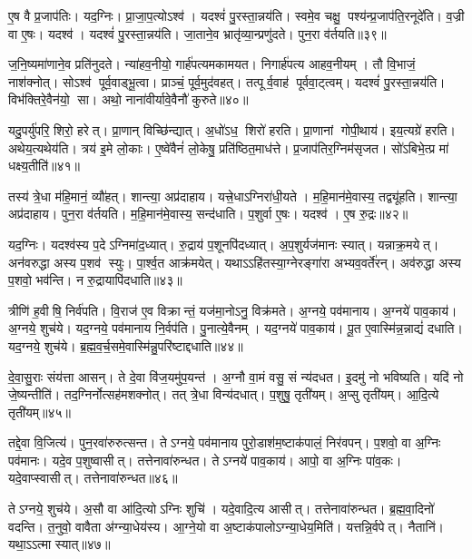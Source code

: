 ए॒ष वै प्र॒जाप॑तिः।
यद॒ग्निः।
प्रा॒जा॒प॒त्योऽश्व॑।
यदश्वं॑ पु॒रस्ता॒न्नय॑ति।
स्वमे॒व चक्षु॒ पश्य॑न्प्र॒जाप॑ति॒रनूदे॑ति।
व॒ज्री वा ए॒षः।
यदश्व॑।
यदश्वं॑ पु॒रस्ता॒न्नय॑ति।
जा॒ताने॒व भ्रातृ॑व्या॒न्प्रणु॑दते।
पुन॒रा व॑र्तयति॥३९॥

ज॒नि॒ष्यमा॑णाने॒व प्रति॑नुदते।
न्या॑हव॒नीयो॒ गार्\mbox{}ह॑पत्य\-मकामयत।
निगार्\mbox{}ह॑पत्य आहव॒नीयम्।
तौ वि॒भाजं॒ नाश॑क्नोत्।
सोऽश्व॑ पूर्व॒वाड्भू॒त्वा।
प्राञ्चं॒ पूर्व॒मुद॑वहत्।
तत्पूर्व॒वाह॑ पूर्ववा॒ट्त्वम्।
यदश्वं॑ पु॒रस्ता॒न्नय॑ति।
विभ॑क्तिरे॒वैन॑यो॒ सा।
अथो॒ नाना॑वीर्यावे॒वैनौ॑ कुरुते॥४०॥

यदु॒पर्यु॑परि॒ शिरो॒ हरेत्।
प्रा॒णान्‌ विच्छि॑न्द्यात्।
अ॒धो॑ऽध॒ शिरो॑ हरति।
प्रा॒णानां गोपी॒थाय॑।
इय॒त्यग्रे॑ हरति।
अथेय॒त्यथेय॑ति।
त्रय॑ इ॒मे लो॒काः।
ए॒ष्वे॑वैनं॑ लो॒केषु॒ प्रति॑ष्ठित॒माध॑त्ते।
प्र॒जाप॑तिर॒ग्निम॑सृजत।
सो॑ऽबिभे॒त्प्र मा॑ धक्ष्य॒तीति॑॥४१॥

तस्य॑ त्रे॒धा म॑हि॒मानं॒ व्यौ॑हत्।
शान्त्या॒ अप्र॑दाहाय।
यत्त्रे॒धाऽग्निरा॑धी॒यते।
म॒हि॒मान॑मे॒वास्य॒ तद्व्यू॑हति।
शान्त्या॒ अप्र॑दाहाय।
पुन॒रा व॑र्तयति।
म॒हि॒मान॑मे॒वास्य॒ सन्द॑धाति।
प॒शुर्वा ए॒षः।
यदश्व॑।
ए॒ष रु॒द्रः॥४२॥

यद॒ग्निः।
यदश्व॑स्य प॒देऽग्निमा॑द॒ध्यात्।
रु॒द्राय॑ प॒शूनपि॑दध्यात्।
अ॒प॒शुर्यज॑मानः स्यात्।
यन्नाक्र॒मयेत्।
अन॑वरुद्धा अस्य प॒शव॑ स्युः।
पा॒र्श्व॒त आक्र॑मयेत्।
यथाऽऽहि॑तस्या॒ग्नेरङ्गा॑रा अभ्यव॒वर्ते॑रन्।
अव॑रुद्धा अस्य प॒शवो॒ भव॑न्ति।
न रु॒द्रायापि॑दधाति॥४३॥

त्रीणि॑ ह॒वीषि॒ निर्व॑पति।
वि॒राज॑ ए॒व विक्रान्तं॒ यज॑मा॒नोऽनु॒ विक्र॑मते।
अ॒ग्नये॒ पव॑मानाय।
अ॒ग्नये॑ पाव॒काय॑।
अ॒ग्नये॒ शुच॑ये।
यद॒ग्नये॒ पव॑मानाय नि॒र्वप॑ति।
पु॒नात्ये॒वैनम्।
यद॒ग्नये॑ पाव॒काय॑।
पू॒त ए॒वास्मि॑न्न॒न्नाद्यं॑ दधाति।
यद॒ग्नये॒ शुच॑ये।
ब्र॒ह्म॒व॒र्च॒समे॒वास्मि॑न्नु॒परि॑ष्टाद्दधाति॥४४॥\anuvakamend[ए॒न॒मा॒ह॒व॒नीयं॑ धत्तेऽश्व॒त्वं व॑र्तयति कुरुत॒ इति॑ रु॒द्रो द॑धाति॒ यद॒ग्नये॒ शुच॑य॒ एकं॑ च]

दे॒वा॒सु॒राः संय॑त्ता आसन्।
ते दे॒वा वि॑ज॒यमु॑प॒यन्त॑।
अ॒ग्नौ वा॒मं वसु॒ सं न्य॑दधत।
इ॒दमु॑ नो भविष्यति।
यदि॑ नो जे॒ष्यन्तीति॑।
तद॒ग्निर्नोत्सह॑मशक्नोत्।
तत् त्रे॒धा विन्य॑दधात्।
प॒शुषु॒ तृती॑यम्।
अ॒प्सु तृती॑यम्।
आ॒दि॒त्ये तृती॑यम्॥४५॥

तद्दे॒वा वि॒जित्य॑।
पुन॒रवा॑रुरुत्सन्त।
तेऽग्नये॒ पव॑मानाय पुरो॒डाश॑म॒ष्टाक॑पालं॒ निर॑वपन्।
प॒शवो॒ वा अ॒ग्निः पव॑मानः।
यदे॒व प॒शुष्वासीत्।
तत्तेनावा॑रुन्धत।
तेऽग्नये॑ पाव॒काय॑।
आपो॒ वा अ॒ग्निः पा॑व॒कः।
यदे॒वाप्स्वासीत्।
तत्तेनावा॑रुन्धत॥४६॥

तेऽग्नये॒ शुच॑ये।
अ॒सौ वा आ॑दि॒त्योऽग्निः शुचि॑।
यदे॒वादि॒त्य आसीत्।
तत्तेनावा॑रुन्धत।
ब्र॒ह्म॒वा॒दिनो॑ वदन्ति।
त॒नुवो॒ वावैता अ॑ग्न्या॒धेय॑स्य।
आ॒ग्ने॒यो वा अ॒ष्टाक॑पालोऽग्न्या॒धेय॒मिति॑।
यत्तन्नि॒र्वपेत्।
नैतानि॑।
यथा॒ऽऽत्मा स्यात्॥४७॥

